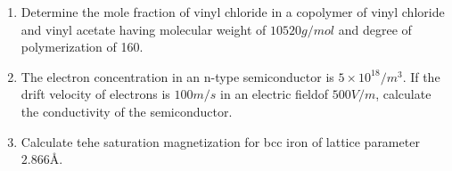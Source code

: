 \documentclass[journal]{IEEEtran}
\begin{document}
\begin{enumerate}[start=10]
\item %
Determine the mole fraction of vinyl chloride in a copolymer of vinyl chloride  and vinyl acetate  having molecular weight of $10520 g/mol$ and degree of polymerization of 160. 
\begin{enumerate}
\end{enumerate}

\item %
The electron concentration in an n-type semiconductor is $5 \times 10^{18}/m^3$. If the drift velocity of electrons is $100m/s$ in an electric fieldof $500V/m $, calculate the conductivity of the semiconductor.
\begin{enumerate}
\end{enumerate}

\item %
Calculate tehe saturation magnetization  for bcc iron of lattice parameter $2.866 \text{\AA} $. 
\begin{enumerate}
\end{enumerate}


\end{enumerate}
\end{document}
